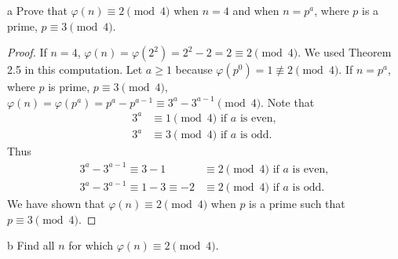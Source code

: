 \begin{exercise}{4}{a}
  Prove that \( \varphi(n) \equiv 2 \pmod{4} \) when \( n = 4 \) and
  when \( n = p^a \), where \( p \) is a prime, \( p \equiv 3
  \pmod{4} \).
\end{exercise}

\begin{proof}
  If \( n = 4 \), \( \varphi(n) = \varphi(2^2) = 2^2 - 2 = 2 \equiv 2
  \pmod{4} \). We used Theorem 2.5 in this computation. Let \( a \ge 1
  \) because \( \varphi(p^0) = 1 \not\equiv 2 \pmod{4} \). If \( n =
  p^a \), where \( p \) is prime, \( p \equiv 3 \pmod{4} \), \(
  \varphi(n) = \varphi(p^a) = p^a - p^{a - 1} \equiv 3^a - 3^{a - 1}
  \pmod{4} \). Note that
  \begin{align*}
    3^a & \equiv 1 \pmod{4} \text{ if } a \text{ is even}, \\
    3^a & \equiv 3 \pmod{4} \text{ if } a \text{ is odd}.
  \end{align*}
  Thus
  \begin{align*}
    3^a - 3^{a - 1} \equiv 3 - 1 & \equiv 2 \pmod{4}
    	\text{ if } a \text{ is even}, \\
    3^a - 3^{a - 1} \equiv 1 - 3 \equiv -2 & \equiv 2 \pmod{4}
    	\text{ if } a \text{ is odd}.
  \end{align*}
  We have shown that \( \varphi(n) \equiv 2 \pmod{4} \) when \( p \)
  is a prime such that \( p \equiv 3 \pmod{4} \).
\end{proof}


\begin{exercise}{4}{b}
  Find all \( n \) for which \( \varphi(n) \equiv 2 \pmod{4} \).
\end{exercise}


